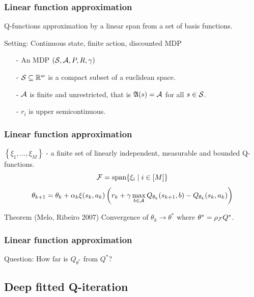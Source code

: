 \documentclass{beamer}[10]
\begin{document}
\begin{frame}
  \frametitle{Linear function approximation}  
  Q-functions approximation by a linear span from a set of basis functions.
  \begin{block}{Setting: Continuous state, finite action, discounted MDP}
    \leavevmode
    \begin{itemize}
      \item[-] An MDP $(\mathcal{S}, \mathcal{A}, P, R, \gamma)$
      \item[-] $\mathcal{S} \subseteq \mathbb{R}^w$ is a compact subset of a euclidean space.
      \item[-] $\mathcal{A}$ is finite and unrestricted, that
	is $\frak{A}(s) = \mathcal{A}$ for all 
	$s \in \mathcal{S}$.
      \item[-] $r_i$ is upper semicontinuous.
    \end{itemize}
  \end{block}
\end{frame}

\begin{frame}
  \frametitle{Linear function approximation}
  $\left\{ \xi_1, \dots, \xi_M \right\}$ - a finite set of linearly
  independent, measurable and bounded Q-functions.
  \[ \mathcal{F} = \mathrm{span} \{ \xi_i \mid i \in [M] \} \]
  \begin{equation*}
    \theta_{k+1} = \theta_k + \alpha_k \xi(s_k, a_k)
    \left( r_k + \gamma \max_{b \in \mathcal{A}} Q_{\theta_k}(s_{k+1}, b)
    - Q_{\theta_k}(s_k, a_k) \right)
  \end{equation*}
  \begin{block}{Theorem (Melo, Ribeiro 2007)}
    Convergence of $\theta_k \to \theta^*$
    where $\theta^* = \rho_{\mathcal{F}} Q^*$.
  \end{block}
\end{frame}

\begin{frame}
  \frametitle{Linear function approximation}
  Question: How far is $Q_{\theta^*}$ from $Q^*$?
\end{frame}

\subsection{Deep fitted Q-iteration}
\end{document}
